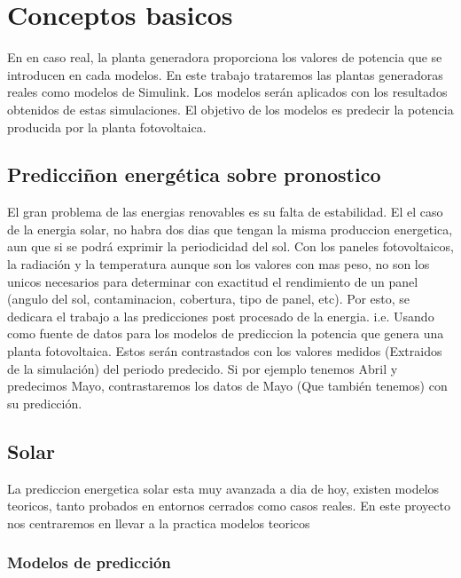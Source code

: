 \chapter{Conceptos basicos}
\label{cha:conceptos_basicos}



En en caso real, la planta generadora proporciona los valores de potencia que se introducen en cada modelos. En este trabajo trataremos las plantas generadoras reales como modelos de Simulink. Los modelos serán aplicados con los resultados obtenidos de estas simulaciones. El objetivo de los modelos es predecir la potencia producida por la planta fotovoltaica. 

\section{Predicciñon energética sobre pronostico} 
\label{sec:prediccion_energetica_sobre_pronostico}

El gran problema de las energias renovables es su falta de estabilidad. El el caso de la energia solar, no habra dos dias que tengan la misma produccion energetica, aun que si se podrá exprimir la periodicidad del sol. 
Con los paneles fotovoltaicos, la radiación y la temperatura aunque son los valores con mas peso, no son los unicos necesarios para determinar con exactitud el rendimiento de un panel (angulo del sol, contaminacion, cobertura, tipo de panel, etc).
Por esto, se dedicara el trabajo a las predicciones post procesado de la energia. i.e. Usando como fuente de datos para los modelos de prediccion la potencia que genera una planta fotovoltaica.
Estos serán contrastados con los valores medidos (Extraidos de la simulación) del periodo predecido.
Si por ejemplo tenemos Abril y predecimos Mayo, contrastaremos los datos de Mayo (Que también tenemos) con su predicción. 	


\section{Solar} 
\label{sec:solar}

La prediccion energetica solar esta muy avanzada a dia de hoy, existen modelos teoricos, tanto probados en entornos cerrados como casos reales. 
En este proyecto nos centraremos en llevar a la practica modelos teoricos


\subsection{Modelos de predicción} 
\label{sub:modelos_de_prediccion}

